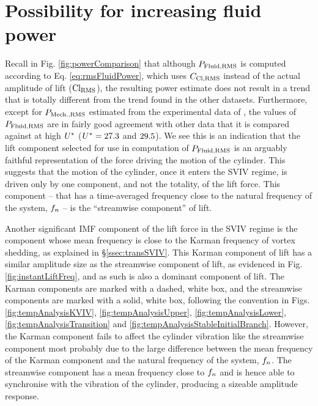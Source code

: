 \documentclass[oneside]{utmthesis}
\begin{document}
\section{Possibility for increasing fluid power} \label{sec:possIncrease}
Recall in Fig. \ref{fig:powerComparison} that although $P_{\text{Fluid,RMS}}$ is computed according to Eq. \ref{eq:rmsFluidPower}, which uses $C_{\text{Cl},\text{RMS}}$ instead of the actual \rms{} amplitude of lift ($\text{Cl}_{\text{RMS}}$), the resulting power estimate does not result in a trend that is totally different from the trend found in the other datasets. Furthermore, except for $P_{\text{Mech.,RMS}}$ estimated from the experimental data of \citet{Nguyen2012}, the values of $P_{\text{Fluid,RMS}}$ are in fairly good agreement with other data that it is compared against at high $U^{*}$ ($U^{*} = 27.3$ and $29.5$). We see this is an indication that the lift component selected for use in computation of $P_{\text{Fluid,RMS}}$ is an arguably faithful representation of the force driving the motion of the cylinder. This suggests that the motion of the cylinder, once it enters the SVIV regime, is driven only by one component, and not the totality, of the lift force. This component -- that has a time-averaged frequency close to the natural frequency of the system, $f_{n}$ -- is the ``streamwise component'' of lift.

Another significant IMF component of the lift force in the SVIV regime is the component whose mean frequency is close to the Karman frequency of vortex shedding, as explained in \S\ref{ssec:transSVIV}. This Karman component of lift has a similar amplitude size as the streamwise component of lift, as evidenced in Fig. \ref{fig:instantLiftFreq}, and as such is also a dominant component of lift. The Karman components are marked with a dashed, white box, and the streamwise components are marked with a solid, white box, following the convention in Figs. \ref{fig:tempAnalysisKVIV}, \ref{fig:tempAnalysisUpper}, \ref{fig:tempAnalysisLower}, \ref{fig:tempAnalysisTransition} and \ref{fig:tempAnalysisStableInitialBranch}. However, the Karman component fails to affect the cylinder vibration like the streamwise component most probably due to the large difference between the mean frequency of the Karman component and the natural frequency of the system, $f_{n}$.  The streamwise component has a mean frequency close to $f_{n}$ and is hence able to synchronise with the vibration of the cylinder, producing a sizeable amplitude response.
\end{document}
